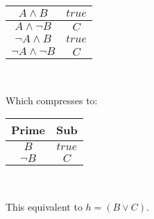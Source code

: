\documentclass{article}
\begin{document}
\begin{enumerate}
\begin{center}
\begin{tabular}{ |c|c| }
             \hline
             $A \land B$ & $true$ \\
             \hline
             $A \land \lnot B$ & $C$ \\
             \hline
             $\lnot A \land B$ & $true$ \\
             \hline
             $\lnot A \land \lnot B$ & $C$ \\
             \hline
            \end{tabular} \\
    \end{center}
    Which compresses to:
    \begin{center}
           \begin{tabular}{ |c|c| }
            \hline
             Prime&Sub \\ 
             \hline
             $B$ & $true$ \\
             \hline
             $\lnot B$ & $C$ \\
             \hline
            \end{tabular} \\
    \end{center}
    This equivalent to $h = (B \lor C)$.
\end{enumerate}
 \clearpage
 \section{}
 
 \clearpage
 \section{}

\clearpage
\section{}

\clearpage
\section{}

\clearpage
\section{}
\end{document}
